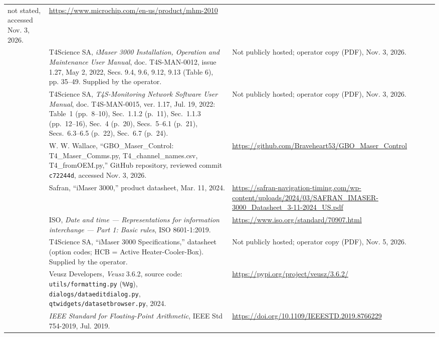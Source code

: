 \documentclass[11pt,a4paper]{article}
\begin{document}
\begin{longtable}{@{}p{.05\linewidth}p{.53\linewidth}p{.34\linewidth}@{}}
not stated, accessed Nov. 3, 2026.
& \url{https://www.microchip.com/en-us/product/mhm-2010}\\[5pt]
[8] & T4Science SA, \textit{iMaser 3000 Installation, Operation and Maintenance
User Manual}, doc. T4S-MAN-0012, issue 1.27, May 2, 2022, Secs. 9.4, 9.6, 9.12,
9.13 (Table 6), pp. 35--49. Supplied by the operator.
& Not publicly hosted; operator copy (PDF), Nov. 3, 2026.\\[5pt]
[9] & T4Science SA, \textit{T4S-Monitoring Network Software User Manual},
doc. T4S-MAN-0015, ver. 1.17, Jul. 19, 2022: Table~1 (pp.~8--10), Sec.~1.1.2 (p.~11),
Sec.~1.1.3 (pp.~12--16), Sec.~4 (p.~20), Secs.~5--6.1 (p.~21), Secs.~6.3--6.5 (p.~22), Sec.~6.7 (p.~24).
& Not publicly hosted; operator copy (PDF), Nov. 3, 2026.\\[5pt]
[10] & W. W. Wallace, ``GBO\_Maser\_Control: T4\_Maser\_Comms.py,
T4\_channel\_names.csv, T4\_fromOEM.py,'' GitHub repository, reviewed commit
\texttt{c72244d}, accessed Nov. 3, 2026.
& \url{https://github.com/Braveheart53/GBO_Maser_Control}\\[5pt]
[11] & Safran, ``iMaser 3000,'' product datasheet, Mar. 11, 2024.
& \url{https://safran-navigation-timing.com/wp-content/uploads/2024/03/SAFRAN_IMASER-3000_Datasheet_3-11-2024_US.pdf}\\[5pt]
[12] & ISO, \textit{Date and time --- Representations for information interchange ---
Part 1: Basic rules}, ISO 8601-1:2019.
& \url{https://www.iso.org/standard/70907.html}\\[5pt]
[13] & T4Science SA, ``iMaser 3000 Specifications,'' datasheet (option codes; HCB = Active
Heater-Cooler-Box). Supplied by the operator.
& Not publicly hosted; operator copy (PDF), Nov. 5, 2026.\\[5pt]
[14] & Veusz Developers, \textit{Veusz} 3.6.2, source code: \texttt{utils/formatting.py}
(\texttt{\%Vg}), \texttt{dialogs/dataeditdialog.py}, \texttt{qtwidgets/datasetbrowser.py}, 2024.
& \url{https://pypi.org/project/veusz/3.6.2/}\\[5pt]
[15] & \textit{IEEE Standard for Floating-Point Arithmetic}, IEEE Std 754-2019, Jul. 2019.
& \url{https://doi.org/10.1109/IEEESTD.2019.8766229}\\
\bottomrule
\end{longtable}
\normalsize
\end{document}
